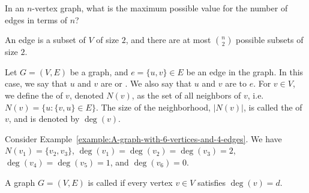 \begin{flex}
\label{grp:exercise:Max-number-of-edges-in-a-graph}

\begin{exercise}
\label{exercise:Max-number-of-edges-in-a-graph}
In an $n$-vertex graph, what is the maximum possible value for the number of edges in terms of $n$?

\end{exercise}

\begin{solution}
\label{sol:intro-to-graph-theory::edge}
An edge is a subset of $V$ of size $2$, and there are at most $n \choose 2$ possible subsets of size $2$.

\end{solution}
\end{flex}

\begin{flex}
\label{grp:definition:Neighborhood-of-a-vertex}

\begin{definition}
\label{definition:Neighborhood-of-a-vertex}
Let $G=(V,E)$ be a graph, and $e = \{u,v\} \in E$ be an edge in the graph. In this case, we say that $u$ and $v$ are  or . We also say that $u$ and $v$ are  to $e$. For $v \in V$, we define the  of $v$, denoted $N(v)$, as the set of all neighbors of $v$, i.e. $N(v) = \{u : \{v,u\} \in E\}$. The size of the neighborhood, $|N(v)|$, is called the  of $v$, and is denoted by $\deg(v)$.

\end{definition}

\begin{example}
\label{example:Example-of-neighborhood-and-degree}
Consider Example~\ref{example:A-graph-with-6-vertices-and-4-edges}. We have $N(v_1) = \{v_2,v_3\}$, $\deg(v_1) = \deg(v_2) = \deg(v_3) = 2$, $\deg(v_4) = \deg(v_5) = 1$, and $\deg(v_6) = 0$.

\end{example}
\end{flex}

\begin{definition}
\label{definition:d-regular-graphs}
A graph $G = (V,E)$ is called  if every vertex $v \in V$ satisfies $\deg(v) = d$. 

\end{definition}

